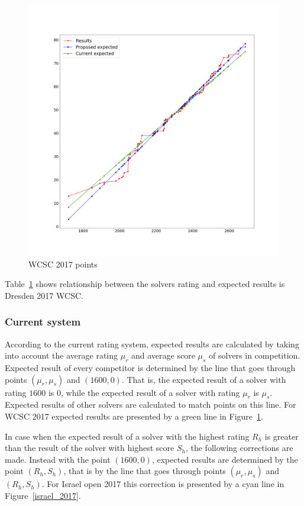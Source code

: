 \documentclass[preprint,12pt]{article}
\begin{document}
\begin{figure}[h]
\includegraphics[width=1.0\linewidth]
{Dresden_points}\caption{WCSC 2017 points}
\label{dresden_2017}
\end{figure}

Table~\ref{dresden_2017} shows relationship between the solvers rating and
expected results is Dresden 2017 WCSC.

\subsubsection{Current system}

According to the current rating system,
expected results are calculated by taking into account the
average rating $\mu_r$ and average score $\mu_s$ of solvers in competition.
Expected result of every competitor
is determined by the line that goes through points
$(\mu_r, \mu_s)$ and $(1600, 0)$.
That is, the expected result of a solver with rating $1600$ is $0$,
while the expected result of a solver with rating $\mu_r$ is $\mu_s$.
Expected results of other solvers are calculated to match points on this line.
For WCSC 2017 expected results are presented by a green line in Figure~\ref{dresden_2017}.

In case when the expected result of a solver with the highest rating $R_h$
is greater than the result of the solver with highest score $S_h$,
the following corrections are made. Instead with the point $(1600, 0)$,
expected results are determined by the point $(R_h, S_h)$, that is
by the line that goes through points $(\mu_r, \mu_s)$ and $(R_h, S_h)$.
For Israel open 2017 this correction is presented by a cyan line in Figure~\ref{israel_2017}.
\end{document}
